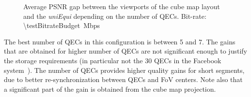 \begin{figure}[htbp]
\centering

\caption{Average \acs{PSNR} gap between the viewports of the cube map layout and the \textit{uniEqui} depending
on the number of QECs. 
Bit-rate: \SI{\testBitrateBudget}{\mega bps}}
\label{fig:QEC}
\end{figure}

The best number of QECs in this configuration is between 5 and 7. The gains that are obtained for
higher number of QECs are not significant enough to justify the storage requirements (in particular not
the 30 QECs in the Facebook system~\cite{facebook}). The number of
QECs provides higher quality gains for short segments, due to better re-synchronization between QECs
and FoV centers. Note also that a significant part of the gain is obtained from the cube map projection.
%
